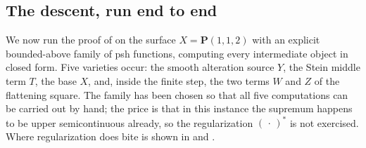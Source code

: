 \subsection{The descent, run end to end}
\label{sec:ch42-cone-endtoend}

We now run the proof of  on the surface
$X=\mathbf P(1,1,2)$ with an explicit bounded-above family of psh
functions, computing every intermediate object in closed form.  Five
varieties occur: the smooth alteration source $Y$, the Stein middle term
$T$, the base $X$, and, inside the finite step, the two terms $W$ and
$Z$ of the flattening square.  The family has been chosen so that all five
computations can be carried out by hand; the price is that in this instance
the supremum happens to be upper semicontinuous already, so the
regularization $(\,\cdot\,)^*$ is not exercised.  Where regularization does
bite is shown in  and
.

